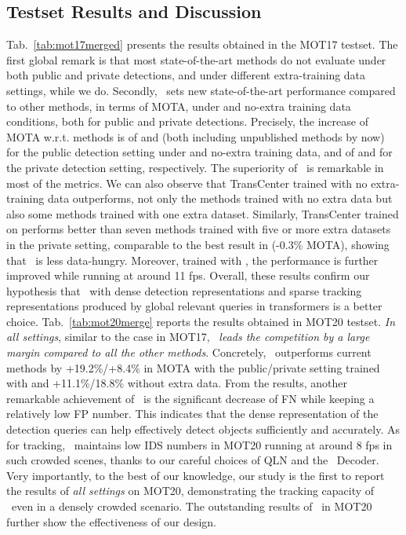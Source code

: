 \subsection{Testset Results and Discussion}\label{sec:sota}
 Tab.~\ref{tab:mot17merged} presents the results obtained in the MOT17 testset. The first global remark is that most state-of-the-art methods do not evaluate under both public and private detections, and under different extra-training data settings, while we do. Secondly, \method~sets new state-of-the-art performance compared to other methods, in terms of MOTA, under  and no-extra training data conditions, both for public and private detections. Precisely, the increase of MOTA w.r.t.  methods is of  and  (both including unpublished methods by now) for the public detection setting under  and no-extra training data, and of  and  for the private detection setting, respectively. The superiority of \method\ is remarkable in most of the metrics. We can also observe that TransCenter trained with no extra-training data outperforms, not only the methods trained with no extra data but also some methods trained with one extra dataset. Similarly, TransCenter trained on  performs better than seven methods trained with five or more extra datasets in the private setting, comparable to the best result in  (-0.3\% MOTA), showing that \method\ is less data-hungry. Moreover, trained with , the performance is further improved while running at around 11 fps. Overall, these results confirm our hypothesis that \method\ with dense detection representations and sparse tracking representations produced by global relevant queries in transformers is a better choice.
 Tab.~\ref{tab:mot20merge} reports the results obtained in MOT20  testset. \emph{In all settings}, similar to the case in MOT17, \method\ \emph{leads the competition by a large margin compared to all the other methods}. Concretely, \method\ outperforms current methods by +19.2\%/+8.4\% in MOTA with the public/private setting trained with  and +11.1\%/18.8\% without extra data. From the results, another remarkable achievement of \method\ is the significant decrease of FN while keeping a relatively low FP number. This indicates that the dense representation of the detection queries can help effectively detect objects sufficiently and accurately. As for tracking, \method\ maintains low IDS numbers in MOT20 running at around 8 fps in such crowded scenes, thanks to our careful choices of QLN and the \method\ Decoder. Very importantly, to the best of our knowledge, our study is the first to report the results of \emph{all settings} on MOT20, demonstrating the tracking capacity of \method\ even in a densely crowded scenario. The outstanding results of \method\ in MOT20 further show the effectiveness of our design.


